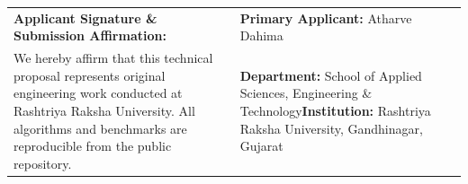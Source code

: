 \documentclass[10pt,a4paper]{article}
\begin{document}
\vspace{0.4em}
\noindent
\begin{tabularx}{\textwidth}{|X|X|}
\hline
\textbf{Applicant Signature \& Submission Affirmation:} & \textbf{Primary Applicant:} Atharve Dahima \\
We hereby affirm that this technical proposal represents original engineering work conducted at Rashtriya Raksha University. All algorithms and benchmarks are reproducible from the public repository. & \textbf{Department:} School of Applied Sciences, Engineering \& Technology\newline \textbf{Institution:} Rashtriya Raksha University, Gandhinagar, Gujarat \\
\hline
\end{tabularx}
\end{document}
